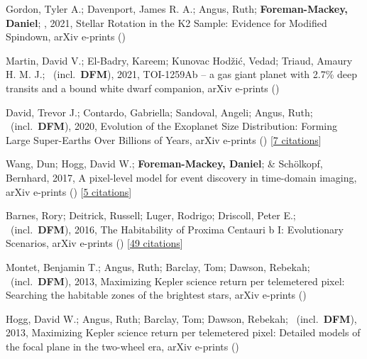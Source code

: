 \item[{\color{numcolor}\scriptsize7}] Gordon, Tyler A.; Davenport, James R. A.; Angus, Ruth; \textbf{Foreman-Mackey, Daniel}; \etal, 2021, Stellar Rotation in the K2 Sample: Evidence for Modified Spindown, arXiv e-prints ()

\item[{\color{numcolor}\scriptsize6}] Martin, David V.; El-Badry, Kareem; Kunovac Hod{\v{z}}i{\'c}, Vedad; Triaud, Amaury H. M. J.; \etal\ (incl.\ \textbf{DFM}), 2021, TOI-1259Ab -- a gas giant planet with 2.7{\%} deep transits and a bound white dwarf companion, arXiv e-prints ()

\item[{\color{numcolor}\scriptsize5}] David, Trevor J.; Contardo, Gabriella; Sandoval, Angeli; Angus, Ruth; \etal\ (incl.\ \textbf{DFM}), 2020, Evolution of the Exoplanet Size Distribution: Forming Large Super-Earths Over Billions of Years, arXiv e-prints () [\href{https://ui.adsabs.harvard.edu/abs/2020arXiv201109894D}{7 citations}]

\item[{\color{numcolor}\scriptsize4}] Wang, Dun; Hogg, David W.; \textbf{Foreman-Mackey, Daniel}; \& Sch{\"o}lkopf, Bernhard, 2017, A pixel-level model for event discovery in time-domain imaging, arXiv e-prints () [\href{https://ui.adsabs.harvard.edu/abs/2017arXiv171002428W}{5 citations}]

\item[{\color{numcolor}\scriptsize3}] Barnes, Rory; Deitrick, Russell; Luger, Rodrigo; Driscoll, Peter E.; \etal\ (incl.\ \textbf{DFM}), 2016, The Habitability of Proxima Centauri b I: Evolutionary Scenarios, arXiv e-prints () [\href{https://ui.adsabs.harvard.edu/abs/2016arXiv160806919B}{49 citations}]

\item[{\color{numcolor}\scriptsize2}] Montet, Benjamin T.; Angus, Ruth; Barclay, Tom; Dawson, Rebekah; \etal\ (incl.\ \textbf{DFM}), 2013, Maximizing Kepler science return per telemetered pixel: Searching the habitable zones of the brightest stars, arXiv e-prints ()

\item[{\color{numcolor}\scriptsize1}] Hogg, David W.; Angus, Ruth; Barclay, Tom; Dawson, Rebekah; \etal\ (incl.\ \textbf{DFM}), 2013, Maximizing Kepler science return per telemetered pixel: Detailed models of the focal plane in the two-wheel era, arXiv e-prints ()